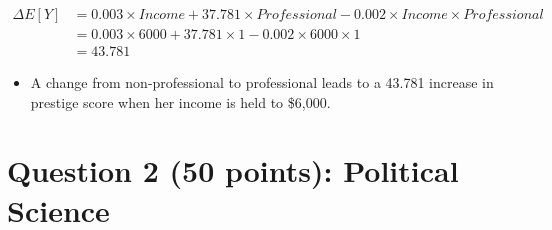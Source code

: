 \documentclass[12pt,letterpaper]{article}
\begin{document}
\begin{enumerate}
		\begin{align*}
		\Delta E[Y] &= 0.003 \times Income + 37.781 \times Professional - 0.002 \times Income \times Professional \\
		&= 0.003 \times 6000 + 37.781 \times 1 - 0.002 \times 6000 \times 1 \\
		&= 43.781
		\end{align*}		\vspace{.25cm}
		\begin{itemize}
			\item [] 		A change from non-professional to professional leads to a 43.781 increase in prestige score when her income is held to \$6,000. 	
		\end{itemize}

	\end{enumerate}
	
	\vspace{1cm}
\section*{Question 2 (50 points): Political Science}
		\vspace{.25cm}
\end{document}
